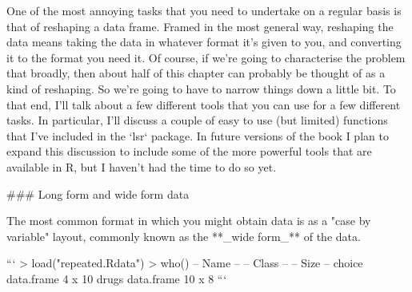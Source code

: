 One of the most annoying tasks that you need to undertake on a regular basis is that of reshaping a data frame. Framed in the most general way, reshaping the data means taking the data in whatever format it's given to you, and converting it to the format you need it. Of course, if we're going to characterise the problem that broadly, then about half of this chapter can probably be thought of as a kind of reshaping. So we're going to have to narrow things down a little bit. To that end, I'll talk about a few different tools that you can use for a few different tasks. In particular, I'll discuss a couple of easy to use (but limited) functions that I've included in the `lsr` package. In future versions of the book I plan to expand this discussion to include some of the more powerful tools that are available in R, but I haven't had the time to do so yet.


### Long form and wide form data


The most common format in which you might obtain data is as a "case by variable" layout, commonly known as the **_wide form_** of the data. 

```
> load("repeated.Rdata")
> who()
   -- Name --   -- Class --   -- Size --
   choice       data.frame    4 x 10    
   drugs        data.frame    10 x 8    
```

